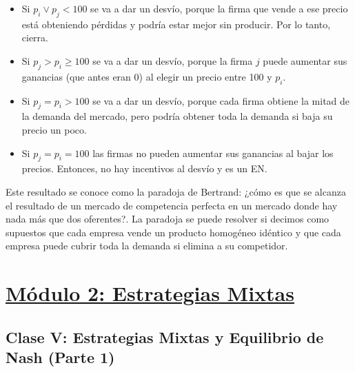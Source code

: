 \documentclass{article}
\begin{document}
                \begin{itemize}
                    \item Si \(p_{i} \vee p_{j} < 100\) se va a dar un desvío, porque la firma que vende a ese precio está obteniendo pérdidas y podría estar mejor sin producir. Por lo tanto, cierra.
                    \item Si \(p_{j} > p_{i} \geq 100\) se va a dar un desvío, porque la firma \(j\) puede aumentar sus ganancias (que antes eran 0) al elegir un precio entre 100 y \(p_{i}\).
                    \item Si \(p_{j} = p_{i} > 100\) se va a dar un desvío, porque cada firma obtiene la mitad de la demanda del mercado, pero podría obtener toda la demanda si baja su precio un poco.
                    \item Si \(p_{j} = p_{i} = 100\) las firmas no pueden aumentar sus ganancias al bajar los precios. Entonces, no hay incentivos al desvío y es un EN.
                \end{itemize}
                Este resultado se conoce como la paradoja de Bertrand: ¿cómo es que se alcanza el resultado de un mercado de competencia perfecta en un mercado donde hay nada más que dos oferentes?. La paradoja se puede resolver si decimos como supuestos que cada empresa vende un producto homogéneo idéntico y que cada empresa puede cubrir toda la demanda si elimina a su competidor.
    \section*{\underline{Módulo 2: Estrategias Mixtas}}
        \subsection*{Clase V: Estrategias Mixtas y Equilibrio de Nash (Parte 1)}
\end{document}
